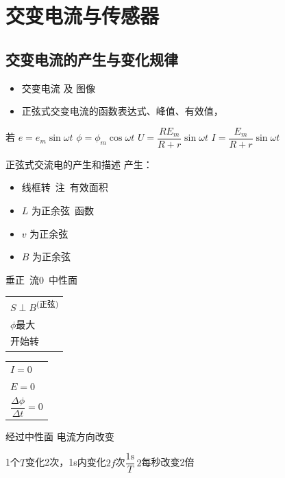 \chapter{交变电流与传感器}
\label{ch:13}

\section{交变电流的产生与变化规律}
\begin{itemize}
\item 交变电流 及 图像
\item 正弦式交变电流的函数表达式、峰值、有效值，
\end{itemize}
若 $e=e_m\sin\omega t$ \qquad $\phi=\phi_m\cos\omega t$ \qquad $U=\dfrac{RE_m}{R+r}\sin\omega t$ \qquad $I=\dfrac{E_m}{R+r}\sin\omega t$

正弦式交流电的产生和描述 \quad 产生：
\begin{itemize}
\item 线框转\ 注\ 有效面积
\item $L$ 为正余弦\ 函数
\item $v$ 为正余弦
\item $B$ 为正余弦
\end{itemize}

垂正\ 流0\ 中性面\qquad {}%

\medskip
\noindent\begin{tabular}[t]{@{}l@{}}$S\perp B$\textsuperscript{\scriptsize(正弦)}\\[3pt] $\phi$最大\\[3pt] 开始转\end{tabular}\quad
\begin{tabular}[t]{@{}l@{}}$I=0$\\[3pt] $E=0$\\[3pt] $\dfrac{\Delta\phi}{\Delta t}=0$\end{tabular}

经过中性面 电流方向改变

\medskip
\noindent 1个$T$变化2次，1s内变化$2f$次\quad $\dfrac{1\mathrm{s}}{T}\,2$\quad 每秒改变2倍


